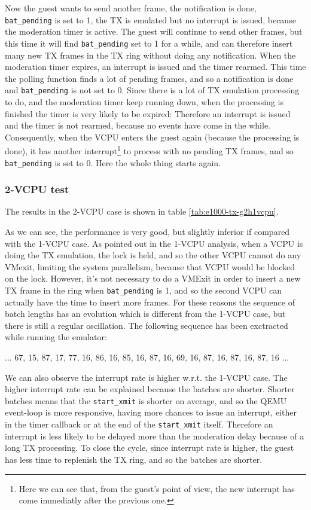 Now the guest wants to send another frame, the notification is done, \texttt{bat\_pending} is set to 1, the TX is emulated but no
interrupt is issued, because the moderation timer is active. The guest will continue to send other frames, but this time it will
find \texttt{bat\_pending} set to 1 for a while, and can therefore insert many new TX frames in the TX ring without doing any notification.
When the moderation timer expires, an interrupt is issued and the timer rearmed. This time the polling function finds a lot of pending 
frames, and so a notification is done and \texttt{bat\_pending} is not set to 0. Since there is a lot of TX emulation processing to do,
and the moderation timer keep running down, when the processing is finished the timer is very likely to be expired: Therefore an interrupt
is issued and the timer is not rearmed, because no events have come in the while. Consequently, when the VCPU enters the guest again
(because the processing is done), it has another
interrupt\footnote{Here we can see that, from the guest's point of view, the new interrupt has come immediatly after the previous one.} 
to process with no pending TX frames, and so \texttt{bat\_pending} is set to 0. Here the whole thing starts again.


\subsubsection{2-VCPU test}
The results in the 2-VCPU case is shown in table \ref{tab:e1000-tx-g2h1vcpu}.

As we can see, the performance is very good, but slightly inferior if compared with the 1-VCPU case.
As pointed out in the 1-VCPU analysis, when a VCPU is doing the TX emulation, the lock is held, and so the other VCPU cannot do any VMexit,
limiting the system parallelism, because that VCPU would be blocked on the lock. However, it's not necessary to do a VMExit in order to 
insert a new TX frame in the ring when \texttt{bat\_pending} is 1, and so the second VCPU can actually have the time to insert more
frames. For these reasons the sequence of batch lengths has an evolution which is different from the 1-VCPU case, but there is still  a 
regular oscillation. The following sequence has been exctracted while running the emulator:
\begin{center}
... 67, 15, 87, 17, 77, 16, 86, 16, 85, 16, 87, 16, 69, 16, 87, 16, 87, 16, 87, 16 ...
\end{center}
We can also observe the interrupt rate is higher w.r.t. the 1-VCPU case. The higher interrupt rate can be explained because the batches
are shorter. Shorter batches means that the \texttt{start\_xmit} is shorter on average, and so the QEMU event-loop is more responsive,
having more chances to issue an interrupt, either in the timer callback or at the end of the \texttt{start\_xmit} itself. Therefore an
interrupt is less likely to be delayed more than the moderation delay because of a long TX processing.
To close the cycle, since interrupt rate is higher, the guest has less time to replenish the TX ring, and so the batches are shorter.

